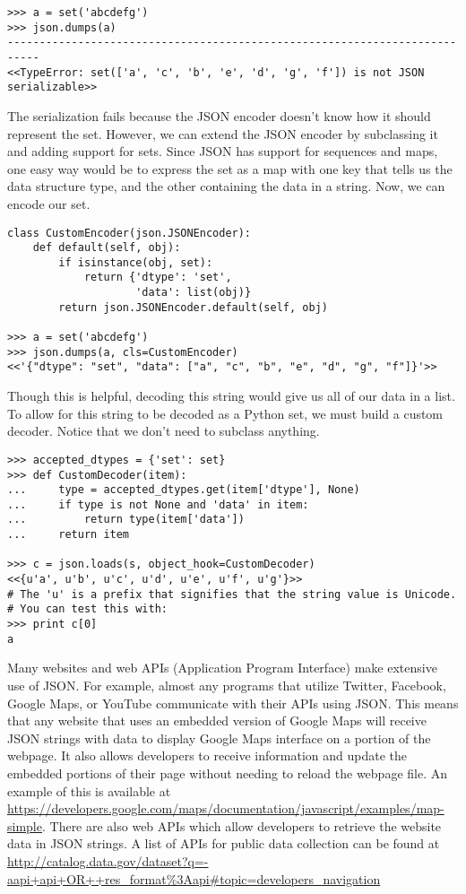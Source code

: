 \begin{lstlisting}
>>> a = set('abcdefg')
>>> json.dumps(a)
---------------------------------------------------------------------------
<<TypeError: set(['a', 'c', 'b', 'e', 'd', 'g', 'f']) is not JSON serializable>>
\end{lstlisting}

The serialization fails because the JSON encoder doesn't know how it should represent the set.
However, we can extend the JSON encoder by subclassing it and adding support for sets.
Since JSON has support for sequences and maps, one easy way would be to express the set as a map with one key that tells us the data structure type, and the other containing the data in a string.
Now, we can encode our set.

\begin{lstlisting}
class CustomEncoder(json.JSONEncoder):
    def default(self, obj):
        if isinstance(obj, set):
            return {'dtype': 'set',
                    'data': list(obj)}
        return json.JSONEncoder.default(self, obj)

>>> a = set('abcdefg')
>>> json.dumps(a, cls=CustomEncoder)
<<'{"dtype": "set", "data": ["a", "c", "b", "e", "d", "g", "f"]}'>>
\end{lstlisting}

Though this is helpful, decoding this string would give us all of our data in a list.
To allow for this string to be decoded as a Python set, we must build a custom decoder.
Notice that we don't need to subclass anything.

\begin{lstlisting}
>>> accepted_dtypes = {'set': set}
>>> def CustomDecoder(item):
...     type = accepted_dtypes.get(item['dtype'], None)
...     if type is not None and 'data' in item:
...         return type(item['data'])
...     return item

>>> c = json.loads(s, object_hook=CustomDecoder)
<<{u'a', u'b', u'c', u'd', u'e', u'f', u'g'}>>
# The 'u' is a prefix that signifies that the string value is Unicode.
# You can test this with:
>>> print c[0]
a
\end{lstlisting}

Many websites and web APIs (Application Program Interface) make extensive use of JSON.
For example, almost any programs that utilize Twitter, Facebook, Google Maps, or YouTube communicate with their APIs using JSON.
This means that any website that uses an embedded version of Google Maps will receive JSON strings with data to display Google Maps interface on a portion of the webpage.
It also allows developers to receive information and update the embedded portions of their page without needing to reload the webpage file.
An example of this is available at \url{https://developers.google.com/maps/documentation/javascript/examples/map-simple}.
There are also web APIs which allow developers to retrieve the website data in JSON strings.
A list of APIs for public data collection can be found at \url{http://catalog.data.gov/dataset?q=-aapi+api+OR++res_format%3Aapi#topic=developers_navigation}

